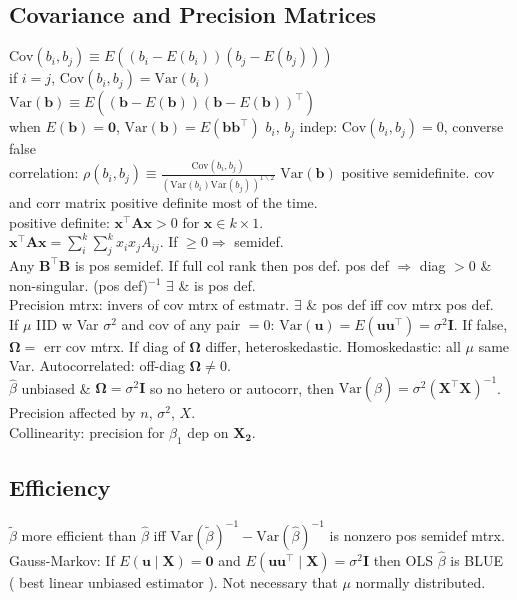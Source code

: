 \subsection*{Covariance and Precision Matrices}
$\text{Cov}(b_i, b_j) \equiv E((b_i - E(b_i))(b_j-E(b_j)))$\\
if $i=j$, $\text{Cov}(b_i, b_j) = \text{Var}(b_i)$\\
$\text{Var}(\mathbf{b}) \equiv E((\mathbf{b}-E(\mathbf{b}))(\mathbf{b}-E(\mathbf{b}))^{\top})$\\
when $E(\mathbf{b}) = \mathbf{0}$, $\text{Var}(\mathbf{b}) = E(\mathbf{bb^{\top}})$
$b_i$, $b_j$ indep: $\text{Cov}(b_i, b_j) = 0$, converse false\\
correlation: $\rho(b_i, b_j) \equiv \frac{\text{Cov}(b_i, b_j)}{(\text{Var}(b_i)\text{Var}(b_j))^{1 \backslash 2}}$
$\text{Var}(\mathbf{b})$ positive semidefinite.
cov and corr matrix positive definite most of the time.\\
positive definite: $\mathbf{x^{\top}Ax} > 0$ for $\mathbf{x} \in k \times 1$.\\
$\mathbf{x^{\top}Ax} = \sum_{i}^{k}\sum_{j}^{k} x_i x_j A_{ij}$.
If $ \geq 0 \Rightarrow$ semidef.\\
Any $\mathbf{B^{\top}B}$ is pos semidef.
If full col rank then pos def.
pos def $\Rightarrow$ diag $> 0$ \& non-singular.
(pos def)$^{-1}$ $\exists$ \& is pos def.\\
Precision mtrx: invers of cov mtrx of estmatr.
$\exists$ \& pos def iff cov mtrx pos def.\\
If $\mu$ IID w Var $\sigma^2$ and cov of any pair $=0$: $\text{Var}(\mathbf{u})=E(\mathbf{uu^{\top}}) = \sigma^{2}\mathbf{I}$.
If false, $\mathbf{\Omega} = $ err cov mtrx.
If diag of $\mathbf{\Omega}$ differ, heteroskedastic.
Homoskedastic: all $\mu$ same Var.
Autocorrelated: off-diag $\mathbf{\Omega} \neq 0$.\\
$\hat{\beta}$ unbiased \& $\mathbf{\Omega}=\sigma^{2}\mathbf{I}$ so no hetero or autocorr, then $\text{Var}(\hat{\beta})=\sigma^2(\mathbf{X^{\top}X})^{-1}$.\\
Precision affected by $n$, $\sigma^2$, $X$.\\
Collinearity: precision for $\beta_1$ dep on $\mathbf{X_2}$.
\subsection*{Efficiency}
$\tilde{\beta}$ more efficient than $\hat{\beta}$ iff $\text{Var}(\tilde{\beta})^{-1} - \text{Var}(\hat{\beta})^{-1}$ is nonzero pos semidef mtrx.\\
Gauss-Markov: If $E(\mathbf{u} \mid \mathbf{X}) = \mathbf{0}$ and $E(\mathbf{uu^{\top}} \mid \mathbf{X}) = \sigma^{2}\mathbf{I}$ then OLS $\hat{\beta}$ is BLUE ( best linear unbiased estimator ).
Not necessary that $\mu$ normally distributed.
